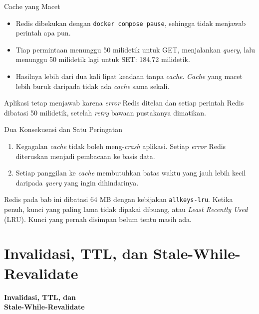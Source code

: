 \documentclass[aspectratio=169, table, 12pt]{beamer}
\begin{document}
\begin{frame}{{\Large Cache yang Macet}}
  \vspace{8pt}
  \begin{itemize}
    \item Redis dibekukan dengan \texttt{docker compose pause}, sehingga tidak
          menjawab perintah apa pun.
    \item Tiap permintaan menunggu 50 milidetik untuk GET, menjalankan \textit{query},
          lalu menunggu 50 milidetik lagi untuk SET: 184,72 milidetik.
    \item Hasilnya lebih dari dua kali lipat keadaan tanpa \textit{cache}.
          \textit{Cache} yang macet lebih buruk daripada tidak ada
          \textit{cache} sama sekali.
  \end{itemize}
  \vspace{6pt}
  {\footnotesize Aplikasi tetap menjawab karena \textit{error} Redis ditelan dan setiap
  perintah Redis dibatasi 50 milidetik, setelah \textit{retry} bawaan pustakanya
  dimatikan.}
\end{frame}

\begin{frame}{{\Large Dua Konsekuensi dan Satu Peringatan}}
  \vspace{8pt}
  \begin{enumerate}
    \item Kegagalan \textit{cache} tidak boleh meng-\textit{crash} aplikasi. Setiap
          \textit{error} Redis diteruskan menjadi pembacaan ke basis data.
    \item Setiap panggilan ke \textit{cache} membutuhkan batas waktu yang jauh
          lebih kecil daripada \textit{query} yang ingin dihindarinya.
  \end{enumerate}
  \vspace{6pt}
  {\footnotesize Redis pada bab ini dibatasi 64 MB dengan kebijakan
  \texttt{allkeys-lru}. Ketika penuh, kunci yang paling lama tidak dipakai
  dibuang, atau \textit{Least Recently Used} (LRU). Kunci yang pernah disimpan
  belum tentu masih ada.}
\end{frame}

\section{Invalidasi, TTL, dan Stale-While-Revalidate}

\begin{frame}{\hfill}
  \centering
  \Huge{\textbf{Invalidasi, TTL, dan\\Stale-While-Revalidate}}
\end{frame}
\end{document}
